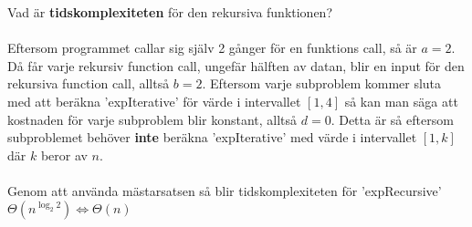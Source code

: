 \documentclass{report}
\begin{document}
\noindent
Vad är \textbf{tidskomplexiteten} för den rekursiva funktionen?\\\\
Eftersom programmet callar sig själv 2 gånger för en funktions call, så är $ a = 2 $. Då får varje rekursiv function call, ungefär hälften av datan, blir en input för den rekursiva function call, alltså $ b = 2 $. Eftersom varje subproblem kommer sluta med att beräkna 'expIterative' för värde i intervallet $ [1,4] $ så kan man säga att kostnaden för varje subproblem blir konstant, alltså $ d=0 $. Detta är så eftersom subproblemet behöver \textbf{inte} beräkna 'expIterative' med värde i intervallet $ [1,k] $ där $ k $ beror av $ n $.\\\\
\noindent
Genom att använda mästarsatsen så blir tidskomplexiteten för 'expRecursive' $ \Theta(n^{\log_{2}2}) \iff \Theta(n)$ 
\end{document}

